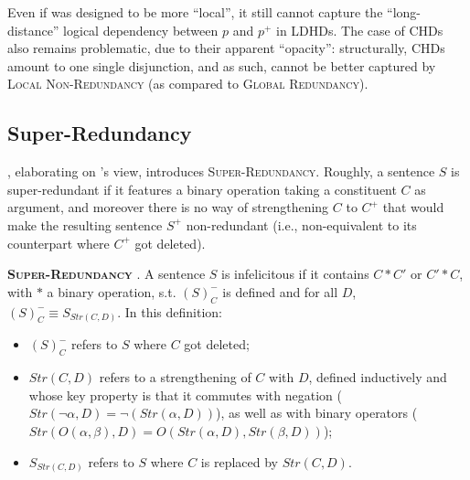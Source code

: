 \begin{exe}
	\label{ex5:local-non-redundancy-ldhd}
\end{exe}

Even if  was designed to be more ``local'',  it still cannot capture the ``long-distance'' logical dependency between $p$ and $p^+$ in LDHDs. The case of CHDs also remains problematic, due to their apparent ``opacity'': structurally, CHDs amount to one single disjunction, and as such, cannot be better captured by \textsc{Local Non-Redundancy} (as compared to \textsc{Global Redundancy}).


\subsection{Super-Redundancy}

\citet{Kalomoiros2024}, elaborating on \citet{Katzir2014}'s view, introduces \textsc{Super-Redundancy}. Roughly, a sentence $S$ is super-redundant if it features a binary operation taking a constituent $C$ as argument, and moreover there is no way of strengthening $C$ to $C^+$ that would make the resulting sentence $S^+$ non-redundant (i.e., non-equivalent to its counterpart where $C^+$ got deleted).

\begin{exe}
	 {\textsc{\textbf{Super-Redundancy}} \citep{Kalomoiros2024}. A sentence $S$ is infelicitous if it contains $C \ast C'$ or $C' \ast C$, with $\ast$ a binary operation, s.t. $(S)^-_C$ is defined and for all $D$, $(S)^-_C \equiv S_{Str(C, D)}$. In this definition:
		\begin{itemize}
			\item $(S)^-_C$ refers to $S$ where $C$ got deleted;
			\item  $Str(C, D)$ refers to a strengthening of $C$ with $D$, defined inductively and whose key property is that it commutes with negation ($Str(\neg\alpha, D) = \neg (Str(\alpha, D))$), as well as with binary operators ($Str(O(\alpha, \beta), D) = O(Str(\alpha, D), Str(\beta, D))$);
			\item $S_{Str(C, D)}$ refers to $S$ where $C$ is replaced by $Str(C, D)$.
	\end{itemize}}
\end{exe}


